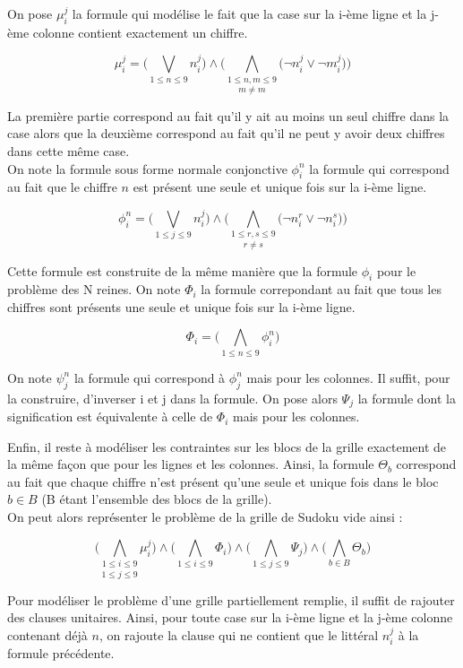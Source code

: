 \documentclass[12pt]{extarticle}
\begin{document}
On pose $\mu_i^j$ la formule qui modélise le fait que la case sur la i-ème ligne et la j-ème colonne contient exactement un chiffre.

$$\mu_i^j = \Big( \bigvee_{1 \leq n \leq 9} n_i^j \Big) \land \Big( \underset{m \neq m}{\bigwedge_{1 \leq n,m \leq 9}} \big( \lnot{n_i^j} \lor \lnot{m_i^j} \big) \Big)$$ 

La première partie correspond au fait qu'il y ait au moins un seul chiffre dans la case alors que la deuxième correspond au fait qu'il ne peut y avoir deux chiffres dans cette même case.\\
On note la formule sous forme normale conjonctive $\phi_i^n$ la formule qui correspond au fait que le chiffre $n$ est présent une seule et unique fois sur la i-ème ligne.

$$ \phi_i^n = \Big( \bigvee_{1 \leq j \leq 9} n_i^j \Big) \land \Big(\underset{r \neq s}{\bigwedge_{1 \leq r, s \leq 9}} \big( \lnot{n_i^r} \lor \lnot{n_i^s} \big) \Big) $$

Cette formule est construite de la même manière que la formule $\phi_i$ pour le problème des N reines.
On note $\Phi_i$ la formule correpondant au fait que tous les chiffres sont présents une seule et unique fois sur la i-ème ligne.

$$\Phi_i = \Big( \bigwedge_{1 \leq n \leq 9} \phi_i^n \Big)$$

On note $\psi_j^n$ la formule qui correspond à $\phi_j^n$ mais pour les colonnes. Il suffit, pour la construire, d'inverser i et j dans la formule.
On pose alors $\Psi_j$ la formule dont la signification est équivalente à celle de $\Phi_i$ mais pour les colonnes.

Enfin, il reste à modéliser les contraintes sur les blocs de la grille exactement de la même façon que pour les lignes et les colonnes. Ainsi, la formule $\Theta_b$ correspond au fait que chaque chiffre n'est présent qu'une seule et unique fois dans le bloc $b \in B$ (B étant  l'ensemble des blocs de la grille). \\
On peut alors représenter le problème de la grille de Sudoku vide ainsi :

$$\Big( \underset{1 \leq j \leq 9}{\bigwedge_{1 \leq i \leq 9}} \mu_i^j \Big) \land \Big( \bigwedge_{1 \leq i \leq 9} \Phi_i \Big) \land \Big( \bigwedge_{1 \leq j \leq 9} \Psi_j \Big) \land \Big( \bigwedge_{b \in B} \Theta_b \Big)$$

Pour modéliser le problème d'une grille partiellement remplie, il suffit de rajouter des clauses unitaires. Ainsi, pour toute case sur la i-ème ligne et la j-ème colonne contenant déjà $n$, on rajoute la clause qui ne contient que le littéral $n_i^j$ à la formule précédente. \\
\end{document}
